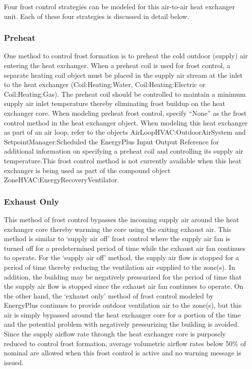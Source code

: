 Four frost control strategies can be modeled for this air-to-air heat exchanger unit. Each of these four strategies is discussed in detail below.

\subsubsection{Preheat}\label{preheat}

One method to control frost formation is to preheat the cold outdoor (supply) air entering the heat exchanger. When a preheat coil is used for frost control, a separate heating coil object must be placed in the supply air stream at the inlet to the heat exchanger (Coil:Heating:Water, Coil:Heating:Electric or Coil:Heating:Gas). The preheat coil should be controlled to maintain a minimum supply air inlet temperature thereby eliminating frost buildup on the heat exchanger core. When modeling preheat frost control, specify ``None'' as the frost control method in the heat exchanger object. When modeling this heat exchanger as part of an air loop, refer to the objects AirLoopHVAC:OutdoorAirSystem and SetpointManager:Scheduled the EnergyPlus Input Output Reference for additional information on specifying a preheat coil and controlling its supply air temperature.This frost control method is not currently available when this heat exchanger is being used as part of the compound object ZoneHVAC:EnergyRecoveryVentilator.

\subsubsection{Exhaust Only}\label{exhaust-only}

This method of frost control bypasses the incoming supply air around the heat exchanger core thereby warming the core using the exiting exhaust air. This method is similar to `supply air off' frost control where the supply air fan is turned off for a predetermined period of time while the exhaust air fan continues to operate. For the `supply air off' method, the supply air flow is stopped for a period of time thereby reducing the ventilation air supplied to the zone(s). In addition, the building may be negatively pressurized for the period of time that the supply air flow is stopped since the exhaust air fan continues to operate. On the other hand, the `exhaust only' method of frost control modeled by EnergyPlus continues to provide outdoor ventilation air to the zone(s), but this air is simply bypassed around the heat exchanger core for a portion of the time and the potential problem with negatively pressurizing the building is avoided. Since the supply airflow rate through the heat exchanger core is purposely reduced to control frost formation, average volumetric airflow rates below 50\% of nominal are allowed when this frost control is active and no warning message is issued.

